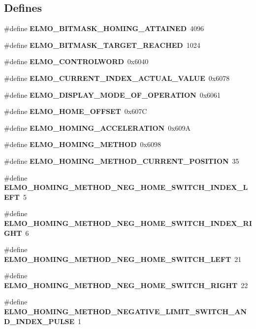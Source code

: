 \subsection*{\-Defines}
\begin{DoxyCompactItemize}
\item 
\#define {\bf \-E\-L\-M\-O\-\_\-\-B\-I\-T\-M\-A\-S\-K\-\_\-\-H\-O\-M\-I\-N\-G\-\_\-\-A\-T\-T\-A\-I\-N\-E\-D}~4096
\item 
\#define {\bf \-E\-L\-M\-O\-\_\-\-B\-I\-T\-M\-A\-S\-K\-\_\-\-T\-A\-R\-G\-E\-T\-\_\-\-R\-E\-A\-C\-H\-E\-D}~1024
\item 
\#define {\bf \-E\-L\-M\-O\-\_\-\-C\-O\-N\-T\-R\-O\-L\-W\-O\-R\-D}~0x6040
\item 
\#define {\bf \-E\-L\-M\-O\-\_\-\-C\-U\-R\-R\-E\-N\-T\-\_\-\-I\-N\-D\-E\-X\-\_\-\-A\-C\-T\-U\-A\-L\-\_\-\-V\-A\-L\-U\-E}~0x6078
\item 
\#define {\bf \-E\-L\-M\-O\-\_\-\-D\-I\-S\-P\-L\-A\-Y\-\_\-\-M\-O\-D\-E\-\_\-\-O\-F\-\_\-\-O\-P\-E\-R\-A\-T\-I\-O\-N}~0x6061
\item 
\#define {\bf \-E\-L\-M\-O\-\_\-\-H\-O\-M\-E\-\_\-\-O\-F\-F\-S\-E\-T}~0x607\-C
\item 
\#define {\bf \-E\-L\-M\-O\-\_\-\-H\-O\-M\-I\-N\-G\-\_\-\-A\-C\-C\-E\-L\-E\-R\-A\-T\-I\-O\-N}~0x609\-A
\item 
\#define {\bf \-E\-L\-M\-O\-\_\-\-H\-O\-M\-I\-N\-G\-\_\-\-M\-E\-T\-H\-O\-D}~0x6098
\item 
\#define {\bf \-E\-L\-M\-O\-\_\-\-H\-O\-M\-I\-N\-G\-\_\-\-M\-E\-T\-H\-O\-D\-\_\-\-C\-U\-R\-R\-E\-N\-T\-\_\-\-P\-O\-S\-I\-T\-I\-O\-N}~35
\item 
\#define {\bf \-E\-L\-M\-O\-\_\-\-H\-O\-M\-I\-N\-G\-\_\-\-M\-E\-T\-H\-O\-D\-\_\-\-N\-E\-G\-\_\-\-H\-O\-M\-E\-\_\-\-S\-W\-I\-T\-C\-H\-\_\-\-I\-N\-D\-E\-X\-\_\-\-L\-E\-F\-T}~5
\item 
\#define {\bf \-E\-L\-M\-O\-\_\-\-H\-O\-M\-I\-N\-G\-\_\-\-M\-E\-T\-H\-O\-D\-\_\-\-N\-E\-G\-\_\-\-H\-O\-M\-E\-\_\-\-S\-W\-I\-T\-C\-H\-\_\-\-I\-N\-D\-E\-X\-\_\-\-R\-I\-G\-H\-T}~6
\item 
\#define {\bf \-E\-L\-M\-O\-\_\-\-H\-O\-M\-I\-N\-G\-\_\-\-M\-E\-T\-H\-O\-D\-\_\-\-N\-E\-G\-\_\-\-H\-O\-M\-E\-\_\-\-S\-W\-I\-T\-C\-H\-\_\-\-L\-E\-F\-T}~21
\item 
\#define {\bf \-E\-L\-M\-O\-\_\-\-H\-O\-M\-I\-N\-G\-\_\-\-M\-E\-T\-H\-O\-D\-\_\-\-N\-E\-G\-\_\-\-H\-O\-M\-E\-\_\-\-S\-W\-I\-T\-C\-H\-\_\-\-R\-I\-G\-H\-T}~22
\item 
\#define {\bf \-E\-L\-M\-O\-\_\-\-H\-O\-M\-I\-N\-G\-\_\-\-M\-E\-T\-H\-O\-D\-\_\-\-N\-E\-G\-A\-T\-I\-V\-E\-\_\-\-L\-I\-M\-I\-T\-\_\-\-S\-W\-I\-T\-C\-H\-\_\-\-A\-N\-D\-\_\-\-I\-N\-D\-E\-X\-\_\-\-P\-U\-L\-S\-E}~1

\end{DoxyCompactItemize}

